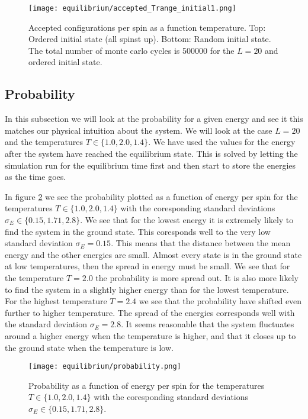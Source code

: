 \documentclass[11pt,a4wide]{article}
\begin{document}
\begin{figure}[htp]
\texttt{[image: equilibrium/accepted\_Trange\_initial1.png]}
\caption{Accepted configurations per spin as a function temperature. Top: Ordered initial state (all spinst up). Bottom: Random initial state. The total number of monte carlo cycles is 500000 for the $L=20$ and ordered initial state. }
\centering
\label{fig:  accepted Trange}
\end{figure}

\subsection{Probability}
In this subsection we will look at the probability for a given energy and see it this matches our physical intuition about the system. We will look at the case $L=20$ and the temperatures $T\in \{1.0, 2.0, 1.4\}$. We have used the values for the energy after the system have reached the equilibrium state. This is solved by letting the simulation run for the equilibrium time first and then start to store the energies as the time goes. 

In figure \ref{fig:  probability} we see the probability plotted as a function of energy per spin for the temperatures $T\in \{1.0, 2.0, 1.4\}$ with the coresponding standard deviations $\sigma_E \in \{0.15, 1.71, 2.8 \}$. We see that for the lowest energy it is extremely likely to find the system in the ground state. This coresponds well to the very low standard deviation $\sigma_E = 0.15$. This means that the distance between the mean energy and the other energies are small. Almost every state is in the ground state at low temperatures, then the spread in energy must be small. We see that for the temperature $T=2.0$ the probability is more spread out. It is also more likely to find the system in a slightly higher energy than for the lowest temperature. For the highest temperature $T=2.4$ we see that the probability have shifted even further to higher temperature. The spread of the energies corresponds well with the standard deviation $\sigma_E = 2.8$. It seems reasonable that the system fluctuates around a higher energy when the temperature is higher, and that it closes up to the ground state when the temperature is low. 

\begin{figure}[htp]
\texttt{[image: equilibrium/probability.png]}
\caption{Probability as a function of energy per spin for the temperatures $T\in \{1.0, 2.0, 1.4\}$ with the coresponding standard deviations $\sigma_E \in \{0.15, 1.71, 2.8 \}$. }
\centering
\label{fig:  probability}
\end{figure}
\end{document}
